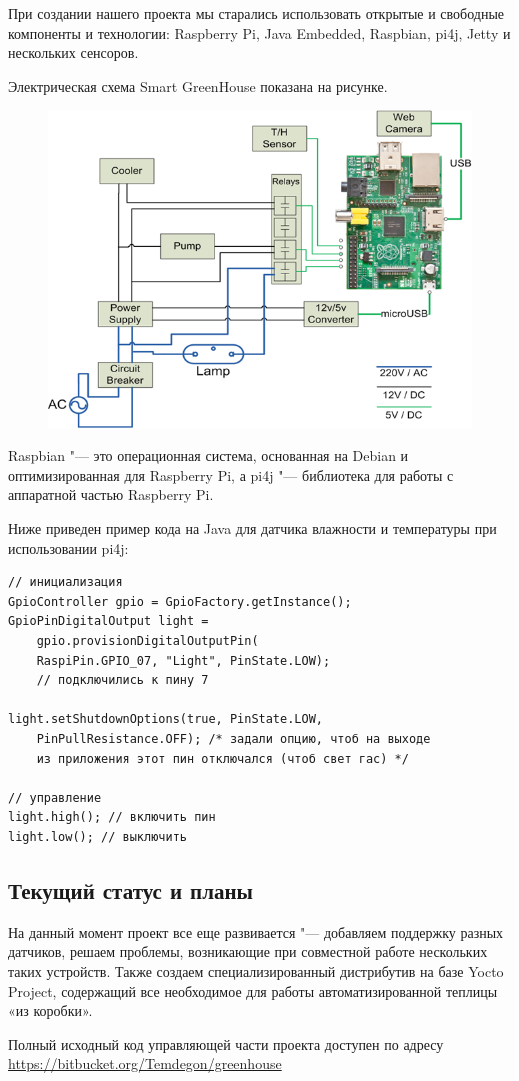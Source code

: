 \documentclass[10pt, a5paper]{article}
\begin{document}
При создании нашего проекта мы старались использовать открытые и свободные компоненты и технологии: Raspberry Pi, Java Embedded, Raspbian, pi4j, Jetty и нескольких сенсоров.

Электрическая схема Smart GreenHouse показана на рисунке.

\begin{figure}[h!]
  \centering
  \includegraphics[scale=0.8]{13_2014_1.png}
\end{figure}

Raspbian "--- это операционная система, основанная на Debian и оптимизированная для Raspberry Pi, а pi4j "--- библиотека для работы с аппаратной частью Raspberry Pi.

Ниже приведен пример кода на Java для датчика влажности и температуры при использовании pi4j:

\begin{verbatim}
// инициализация
GpioController gpio = GpioFactory.getInstance();
GpioPinDigitalOutput light = 
	gpio.provisionDigitalOutputPin(
	RaspiPin.GPIO_07, "Light", PinState.LOW); 
	// подключились к пину 7
	
light.setShutdownOptions(true, PinState.LOW, 
	PinPullResistance.OFF); /* задали опцию, чтоб на выходе 
	из приложения этот пин отключался (чтоб свет гас) */

// управление
light.high(); // включить пин
light.low(); // выключить
\end{verbatim}
\subsection*{Текущий статус и планы}

На данный момент проект все еще развивается "--- добавляем поддержку разных датчиков, решаем проблемы, возникающие при совместной работе нескольких таких устройств. 
Также создаем специализированный дистрибутив на базе Yocto Project, содержащий все необходимое для работы автоматизированной теплицы «из коробки».

Полный исходный код управляющей части проекта доступен по адресу \url{https://bitbucket.org/Temdegon/greenhouse}
\end{document}
